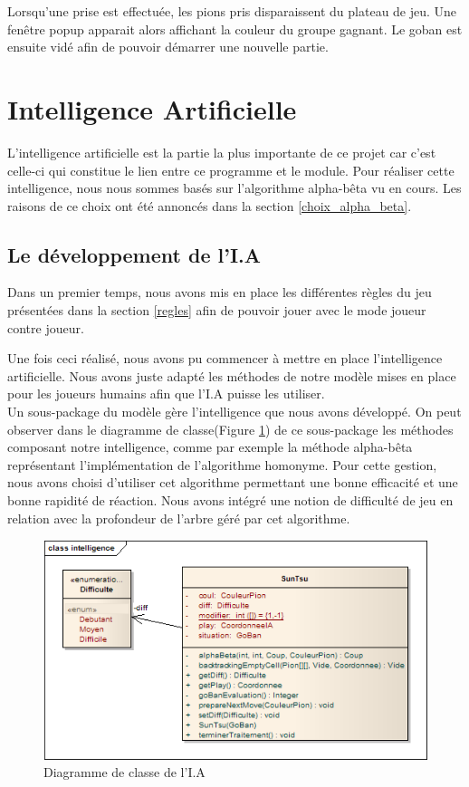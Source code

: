 \documentclass[11pt,a4paper]{article}
\begin{document}
Lorsqu'une prise est effectuée, les pions pris disparaissent du plateau de jeu.
Une fenêtre popup apparait alors affichant la couleur du groupe gagnant.
Le goban est ensuite vidé afin de pouvoir démarrer une nouvelle partie.
\clearpage
\section{Intelligence Artificielle}
L'intelligence artificielle est la partie la plus importante de ce projet car
c'est celle-ci qui constitue le lien entre ce programme et le module.
Pour réaliser cette intelligence, nous nous sommes basés sur l'algorithme
alpha-bêta vu en cours. Les raisons de ce choix ont été annoncés dans la
section \ref{choix_alpha_beta}.

\subsection{Le développement de l'I.A}
Dans un premier temps, nous avons mis en place les différentes règles du jeu
présentées dans la section \ref{regles} afin de pouvoir jouer avec le mode
joueur contre joueur.

Une fois ceci réalisé, nous avons pu commencer à mettre en place l'intelligence
artificielle. Nous avons juste adapté les méthodes de notre modèle mises en
place pour les joueurs humains afin que l'I.A puisse les utiliser.\\

Un sous-package du modèle gère l'intelligence que nous avons développé. On peut
observer dans le diagramme de classe(Figure \ref{diag_intel}) de ce sous-package
les méthodes composant notre intelligence, comme par exemple la méthode
alpha-bêta représentant l'implémentation de l'algorithme homonyme. Pour cette
gestion, nous avons choisi d'utiliser cet algorithme permettant une
bonne efficacité et une bonne rapidité de réaction. Nous avons intégré une notion
de difficulté de jeu en relation avec la profondeur de l'arbre géré par cet
algorithme.

    \begin{figure}[!ht]
    	\begin{center}
			\includegraphics[scale=0.7]{diag_intel.png}
		\end{center}
	\caption{Diagramme de classe de l'I.A}
	\label{diag_intel}
	\end{figure} 
\end{document}
